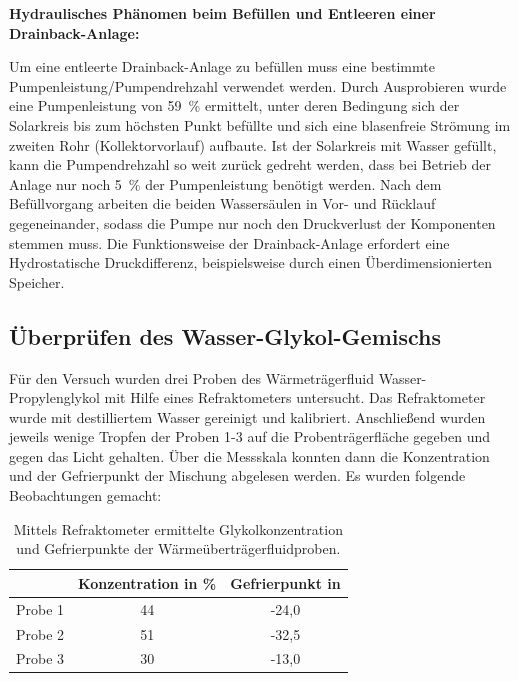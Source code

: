\textbf{Hydraulisches Phänomen beim Befüllen und Entleeren einer Drainback-Anlage:}

Um eine entleerte Drainback-Anlage zu befüllen muss eine bestimmte Pumpenleistung/Pumpendrehzahl verwendet werden. Durch Ausprobieren wurde eine Pumpenleistung von \SI{59}{\percent} ermittelt, unter deren Bedingung sich der Solarkreis bis zum höchsten Punkt befüllte und sich eine blasenfreie Strömung im zweiten Rohr (Kollektorvorlauf) aufbaute. Ist der Solarkreis mit Wasser gefüllt, kann die Pumpendrehzahl so weit zurück gedreht werden, dass bei Betrieb der Anlage nur noch \SI{5}{\percent} der Pumpenleistung benötigt werden. Nach dem Befüllvorgang arbeiten die beiden Wassersäulen in Vor- und Rücklauf gegeneinander, sodass die Pumpe nur noch den Druckverlust der Komponenten stemmen muss. Die Funktionsweise der Drainback-Anlage erfordert eine Hydrostatische Druckdifferenz, beispielsweise durch einen Überdimensionierten Speicher. 

\subsection{Überprüfen des Wasser-Glykol-Gemischs}

Für den Versuch wurden drei Proben des Wärmeträgerfluid Wasser-Propylenglykol mit Hilfe eines Refraktometers untersucht. Das Refraktometer wurde mit destilliertem Wasser gereinigt und kalibriert. Anschließend wurden jeweils wenige Tropfen der Proben 1-3 auf die Probenträgerfläche gegeben und gegen das Licht gehalten. Über die Messskala konnten dann die Konzentration und der Gefrierpunkt der Mischung abgelesen werden. Es wurden folgende Beobachtungen gemacht:

\begin{table}[H]
	\caption{Mittels Refraktometer ermittelte Glykolkonzentration und Gefrierpunkte der Wärmeüberträgerfluidproben.}
	\centering
	\begin{tabular}{lcc}
		\toprule
		& Konzentration in \si{\percent}  & Gefrierpunkt in \textcelsius\\
		\midrule
		Probe 1 &       44               &          -24,0           \\
		Probe 2 &       51            &            -32,5     \\
		Probe 3 &           30           &          -13,0       \\    
		\bottomrule  
	\end{tabular}
\end{table}

